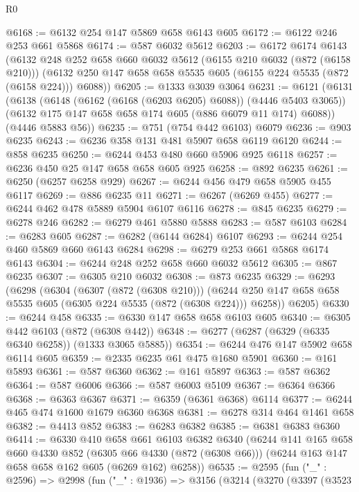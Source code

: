 \begin{lexlean}{R0}
\begin{coremodule}
@6168 := @6132 @254 @147 @5869 @658 @6143 @605
@6172 := @6122 @246 @253 @661 @5868
@6174 := @587 @6032 @5612
@6203 := @6172
    @6174
    @6143
    (@6132
      @248
      @252
      @658
      @660
      @6032
      @5612
      (@6155 @210 @6032 (@872 (@6158 @210)))
      (@6132 @250 @147 @658 @658 @5535 @605 (@6155 @224 @5535 (@872 (@6158 @224))) @6088))
@6205 := @1333 @3039 @3064
@6231 := @6121
    (@6131
      (@6138
        (@6148 (@6162 (@6168 (@6203 @6205) @6088)) (@4446 @5403 @3065))
        (@6132 @175 @147 @658 @658 @174 @605 (@886 @6079 @11 @174) @6088))
      (@4446 @5883 @56))
@6235 := @751 (@754 @442 @6103) @6079
@6236 := @903 @6235
@6243 := @6236 @358 @131 @481 @5907 @658 @6119 @6120
@6244 := @858 @6235
@6250 := @6244 @453 @480 @660 @5906 @925 @6118
@6257 := @6236 @450 @25 @147 @658 @658 @605 @925
@6258 := @892 @6235
@6261 := @6250 (@6257 @6258 @929)
@6267 := @6244 @456 @479 @658 @5905 @455 @6117
@6269 := @886 @6235 @11
@6271 := @6267 (@6269 @455)
@6277 := @6244 @462 @478 @5889 @5904 @6107 @6116
@6278 := @845 @6235
@6279 := @6278 @246
@6282 := @6279 @461 @5880 @5888
@6283 := @587 @6103
@6284 := @6283 @605
@6287 := @6282 (@6144 @6284) @6107
@6293 := @6244 @254 @460 @5869 @660 @6143 @6284
@6298 := @6279 @253 @661 @5868 @6174 @6143
@6304 := @6244 @248 @252 @658 @660 @6032 @5612
@6305 := @867 @6235
@6307 := @6305 @210 @6032
@6308 := @873 @6235
@6329 := @6293
    (@6298
      (@6304
        (@6307 (@872 (@6308 @210)))
        (@6244 @250 @147 @658 @658 @5535 @605 (@6305 @224 @5535 (@872 (@6308 @224))) @6258))
      @6205)
@6330 := @6244 @458
@6335 := @6330 @147 @658 @658 @6103 @605
@6340 := @6305 @442 @6103 (@872 (@6308 @442))
@6348 := @6277 (@6287 (@6329 (@6335 @6340 @6258)) (@1333 @3065 @5885))
@6354 := @6244 @476 @147 @5902 @658 @6114 @605
@6359 := @2335 @6235 @61 @475 @1680 @5901
@6360 := @161 @5893
@6361 := @587 @6360
@6362 := @161 @5897
@6363 := @587 @6362
@6364 := @587 @6006
@6366 := @587 @6003 @5109
@6367 := @6364 @6366
@6368 := @6363 @6367
@6371 := @6359 (@6361 @6368) @6114
@6377 := @6244 @465 @474 @1600 @1679 @6360 @6368
@6381 := @6278 @314 @464 @1461 @658
@6382 := @4413 @852
@6383 := @6283 @6382
@6385 := @6381 @6383 @6360
@6414 := @6330
    @410
    @658
    @661
    @6103
    @6382
    @6340
    (@6244
      @141
      @165
      @658
      @660
      @4330
      @852
      (@6305 @66 @4330 (@872 (@6308 @66)))
      (@6244 @163 @147 @658 @658 @162 @605 (@6269 @162) @6258))
@6535 := @2595
    (fun ("_" : @2596) =>
    @2998
      (fun ("_" : @1936) =>
      @3156
        (@3214
          (@3270
            (@3397
              (@3523

\end{coremodule}
\end{lexlean}
